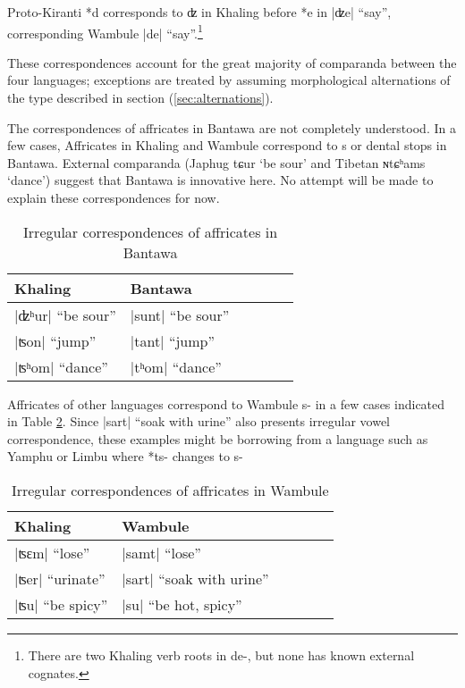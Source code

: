 \documentclass[oldfontcommands,oneside,a4paper,11pt]{article}
\newcommand{\ipa}[1]{{\phon\mbox{#1}}} %
\newcommand{\dhatu}[2]{|\ipa{#1}| ``#2''}
\begin{document}
Proto-Kiranti *\ipa{d} corresponds to \ipa{ʣ} in Khaling before *\ipa{e} in \dhatu{ʣe}{say}, corresponding Wambule \dhatu{de}{say}.\footnote{There are two Khaling verb roots in \ipa{de-}, but none has known external cognates. }

These correspondences account for the great majority of comparanda between the four languages; exceptions are treated by assuming  morphological alternations of the type described in section (\ref{sec:alternations}).

The correspondences of affricates in Bantawa are not completely understood. In a few cases, Affricates in Khaling and Wambule correspond to \ipa{s} or dental stops in Bantawa. External comparanda (Japhug  \ipa{tɕur} `be sour' and Tibetan \ipa{ɴtɕʰams} `dance') suggest that Bantawa is innovative here. No attempt will be made to explain these correspondences for now.

\begin{table}[H]
\caption{Irregular correspondences of affricates in Bantawa} \centering \label{tab:affricates.bantawa}
\begin{tabular}{llllll}
\toprule
Khaling & Bantawa \\
\midrule
\dhatu{ʣʰur}{be sour} & \dhatu{sunt}{be sour}\\
\dhatu{ʦon}{jump} & \dhatu{tant}{jump}\\
\dhatu{ʦʰom}{dance} & \dhatu{tʰom}{dance}\\
\bottomrule
\end{tabular}
\end{table}

Affricates of other languages correspond to Wambule \ipa{s-} in a few cases indicated in Table \ref{tab:affricates.wambule}. Since \dhatu{sart}{soak with urine} also presents irregular vowel correspondence, these examples might  be borrowing from a language such as Yamphu or Limbu where *\ipa{ts-} changes to \ipa{s-}

\begin{table}[H]
\caption{Irregular correspondences of affricates in Wambule} \centering \label{tab:affricates.wambule}
\begin{tabular}{llllll}
\toprule
Khaling & Wambule \\
\midrule
\dhatu{ʦɛm}{lose} & \dhatu{samt}{lose}\\
\dhatu{ʦer}{urinate} & \dhatu{sart}{soak with urine} \\
\dhatu{ʦu}{be spicy} & \dhatu{su}{be hot, spicy}\\
\bottomrule
\end{tabular}
\end{table}
\end{document}
